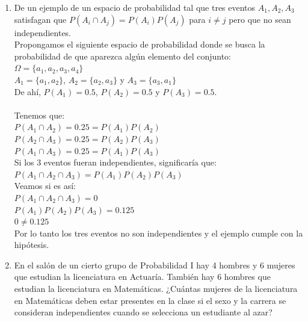 \documentclass[12pt,a4paper]{report}
\begin{document}
\begin{enumerate}
   \item {
   De un ejemplo de un espacio de probabilidad tal que tres eventos $A_{1},A_{2},A_{3}$ satisfagan que $P(A_{i}\cap A_{j})=P(A_{i})P(A_{j})$ para $i\neq j$ pero que no sean independientes.\\
     Propongamos el siguiente espacio de probabilidad donde se busca la probabilidad de que aparezca algún elemento del conjunto:\\
  $\Omega = \lbrace a_{1}, a_{2}, a_{3}, a_{4} \rbrace$\\
  $A_{1} = \lbrace a_{1}, a_{2} \rbrace$, $A_{2} = \lbrace a_{2}, a_{3} \rbrace$ y $A_{3} =  \lbrace a_{3}, a_{1} \rbrace$\\
  De ahí, $P(A_{1}) = 0.5$, $P(A_{2}) = 0.5$ y $P(A_{3}) = 0.5$.\\\\
  Tenemos que:\\
  $P(A_{1} \cap A_{2}) = 0.25 = P(A_{1})P(A_{2})$\\
  $P(A_{2} \cap A_{3}) = 0.25 = P(A_{2})P(A_{3})$\\
  $P(A_{1} \cap A_{3}) = 0.25 = P(A_{1})P(A_{3})$\\

  Si los 3 eventos fueran independientes, significaría que: \\$P(A_{1} \cap A_{2} \cap A_{3}) = P(A_{1})P(A_{2})P(A_{3})$\\
  Veamos si es así:\\
  $P(A_{1} \cap A_{2} \cap A_{3}) = 0$\\
  $P(A_{1})P(A_{2})P(A_{3}) = 0.125$\\
  $ 0  \neq 0.125$ \\
  Por lo tanto los tres eventos no son independientes y el ejemplo cumple con la hipótesis.\\
	}

   \item {En el salón de un cierto grupo de Probabilidad I hay 4 hombres y 6 mujeres que estudian la licenciatura en Actuaría. También hay 6 hombres que estudian la licenciatura en Matemáticas. ¿Cuántas mujeres de la licenciatura en Matemáticas deben estar presentes en la clase si el sexo y la carrera se consideran independientes cuando se selecciona un estudiante al azar?	\\

}
\end{enumerate}
\end{document}
